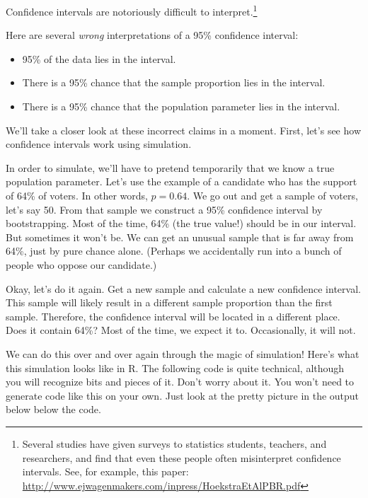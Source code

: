 \documentclass[
]{book}
\begin{document}
Confidence intervals are notoriously difficult to interpret.\footnote{Several studies have given surveys to statistics students, teachers, and researchers, and find that even these people often misinterpret confidence intervals. See, for example, this paper: \url{http://www.ejwagenmakers.com/inpress/HoekstraEtAlPBR.pdf}}

Here are several \emph{wrong} interpretations of a 95\% confidence interval:

\begin{itemize}
\item
  95\% of the data lies in the interval.
\item
  There is a 95\% chance that the sample proportion lies in the interval.
\item
  There is a 95\% chance that the population parameter lies in the interval.
\end{itemize}

We'll take a closer look at these incorrect claims in a moment. First, let's see how confidence intervals work using simulation.

In order to simulate, we'll have to pretend temporarily that we know a true population parameter. Let's use the example of a candidate who has the support of 64\% of voters. In other words, \(p = 0.64\). We go out and get a sample of voters, let's say 50. From that sample we construct a 95\% confidence interval by bootstrapping. Most of the time, 64\% (the true value!) should be in our interval. But sometimes it won't be. We can get an unusual sample that is far away from 64\%, just by pure chance alone. (Perhaps we accidentally run into a bunch of people who oppose our candidate.)

Okay, let's do it again. Get a new sample and calculate a new confidence interval. This sample will likely result in a different sample proportion than the first sample. Therefore, the confidence interval will be located in a different place. Does it contain 64\%? Most of the time, we expect it to. Occasionally, it will not.

We can do this over and over again through the magic of simulation! Here's what this simulation looks like in R. The following code is quite technical, although you will recognize bits and pieces of it. Don't worry about it. You won't need to generate code like this on your own. Just look at the pretty picture in the output below below the code.
\end{document}

